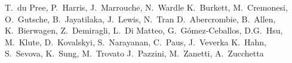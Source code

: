 \begin{Authlist}
%
T.~du Pree, P.~Harris, J.~Marrouche, N.~Wardle
%
K.~Burkett, M.~Cremonesi, O.~Gutsche, B.~Jayatilaka, J.~Lewis, N.~Tran
%
D.~Abercrombie, B.~Allen, K.~Bierwagen, Z.~Demiragli, L.~Di Matteo, G.~G\'omez-Ceballos, D.G.~Hsu, M.~Klute, D.~Kovalskyi, S.~Narayanan, C.~Paus, J.~Veverka
%
K.~Hahn, S.~Sevova, K.~Sung, M.~Trovato
%
J.~Pazzini, M.~Zanetti, A.~Zucchetta
\end{Authlist}
